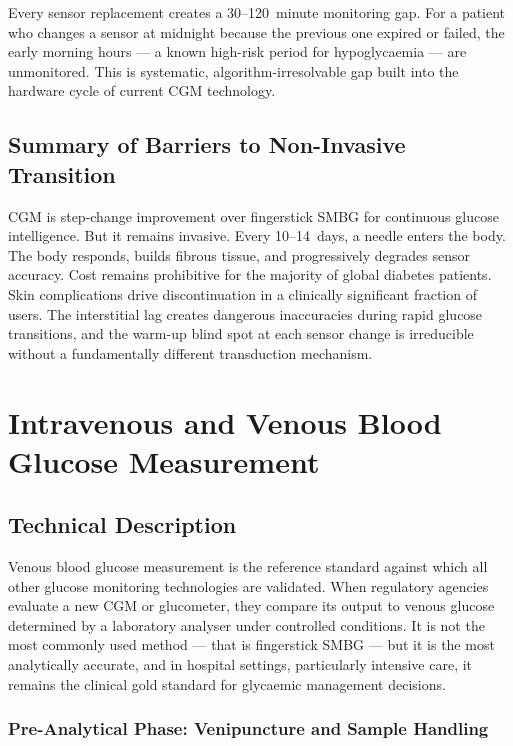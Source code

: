 Every sensor replacement creates a 30--120~minute monitoring gap. For a patient who changes a sensor at midnight because the previous one expired or failed, the early morning hours --- a known high-risk period for hypoglycaemia --- are unmonitored. This is systematic, algorithm-irresolvable gap built into the hardware cycle of current CGM technology.

\section{Summary of Barriers to Non-Invasive Transition}

CGM is step-change improvement over fingerstick SMBG for continuous glucose intelligence. But it remains invasive. Every 10--14~days, a needle enters the body. The body responds, builds fibrous tissue, and progressively degrades sensor accuracy. Cost remains prohibitive for the majority of global diabetes patients. Skin complications drive discontinuation in a clinically significant fraction of users. The interstitial lag creates dangerous inaccuracies during rapid glucose transitions, and the warm-up blind spot at each sensor change is irreducible without a fundamentally different transduction mechanism.

\chapter{Intravenous and Venous Blood Glucose Measurement}
\label{ch:venous}

\section{Technical Description}

Venous blood glucose measurement is the reference standard against which all other glucose monitoring technologies are validated. When regulatory agencies evaluate a new CGM or glucometer, they compare its output to venous glucose determined by a laboratory analyser under controlled conditions. It is not the most commonly used method --- that is fingerstick SMBG --- but it is the most analytically accurate, and in hospital settings, particularly intensive care, it remains the clinical gold standard for glycaemic management decisions.

\subsection*{Pre-Analytical Phase: Venipuncture and Sample Handling}

